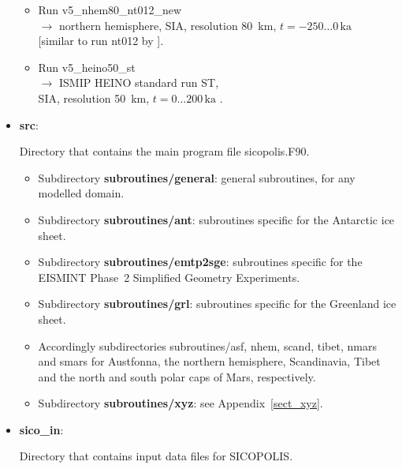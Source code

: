 \documentclass[12pt,a4paper]{article}
\begin{document}
\begin{itemize}
\begin{itemize}
\item
Run v5\_nhem80\_nt012\_new
\\
$\longrightarrow$ northern hemisphere, SIA, resolution 80~km, $t=-250\ldots{}0\,\mathrm{ka}$
\\
\phantom{$\longrightarrow$} [similar to run nt012 by \citet{greve_etal_1999a}].

\item
Run v5\_heino50\_st
\\
$\longrightarrow$ ISMIP HEINO standard run ST,
\\
\phantom{$\longrightarrow$} SIA, resolution 50~km, $t=0\ldots{}200\,\mathrm{ka}$ \citep{calov_etal_2010}.

\end{itemize}

\item \textbf{src}:

Directory that contains the main program file sicopolis.F90.

\begin{itemize}

\item
Subdirectory \textbf{subroutines/general}: general subroutines, for any modelled domain.

\item
Subdirectory \textbf{subroutines/ant}: subroutines specific for the Antarctic ice sheet.

\item
Subdirectory \textbf{subroutines/emtp2sge}: subroutines specific for the EISMINT Phase~2 Simplified Geometry Experiments.

\item
Subdirectory \textbf{subroutines/grl}: subroutines specific for the Greenland ice sheet.

\item
Accordingly subdirectories subroutines/asf, nhem, scand, tibet, nmars and smars for Austfonna, the northern hemisphere, Scandinavia, Tibet and the north and south polar caps of Mars, respectively.

\item
Subdirectory \textbf{subroutines/xyz}: see Appendix~\ref{sect_xyz}.

\end{itemize}

\item \textbf{sico\_in}:

Directory that contains input data files for SICOPOLIS.

\begin{itemize}


\end{itemize}
\end{itemize}
\end{document}
